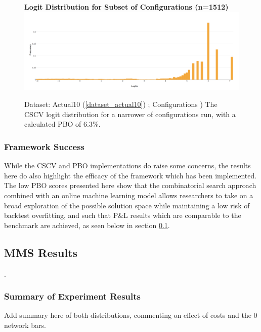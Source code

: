 \documentclass[a4paper,11pt,oneside]{article}
\theoremstyle{plain}
\theoremstyle{definition}
\begin{document}
\begin{figure}[H]
	\centering 
	\textbf{Logit Distribution for Subset of Configurations (n=1512)}
	\includegraphics[scale=0.25]{images/results/pbo/subset_dist.png} 
	\caption{Dataset: Actual10 (\ref{dataset_actual10}) ; Configurations )
		\newline The CSCV logit distribution for a narrower of configurations run, with a calculated PBO of 6.3\%.}
	\label{figure-results_logits_subset}
\end{figure}


\subsubsection{Framework Success}

While the CSCV and PBO implementations do raise some concerns, the results here do also highlight the efficacy of the framework which has been implemented. The low PBO scores presented here show that the combinatorial search approach combined with an online machine learning model allows researchers to take on a broad exploration of the possible solution space while maintaining a low risk of backtest overfitting, and such that P\&L results which are comparable to the benchmark are achieved, as seen below in section \ref{results_mms}.




\newpage
\subsection{MMS Results}\label{results_mms}.

\subsubsection{Summary of Experiment Results}

\todo{}Add summary here of both distributions, commenting on effect of costs and the 0 network bars.\newline
\end{document}
